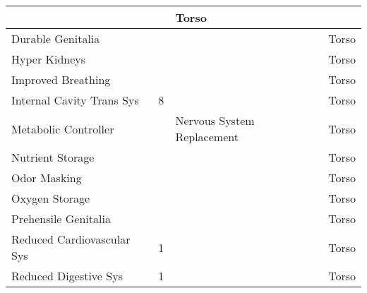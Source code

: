\documentclass[twoside]{book}
\begin{document}
\begin{longtable}{p{1.25in}p{2em}ll}
  &
  
  &
   Torso 
  \tabularnewline
  \hline
      
  \raggedright
           Durable Genitalia 
  &
  
  &
  
  &
   Torso 
  \tabularnewline
  \hline
      
  \raggedright
           Hyper Kidneys 
  &
  
  &
  
  &
   Torso 
  \tabularnewline
  \hline
      
  \raggedright
           Improved Breathing 
  &
  
  &
  
  &
   Torso 
  \tabularnewline
  \hline
      
  \raggedright
           Internal Cavity Trans Sys
           
  &
   8 
  &
  
  &
   Torso 
  \tabularnewline
  \hline
      
  \raggedright
           Metabolic Controller 
  &
  
  &
   Nervous System
           Replacement 
  &
   Torso 
  \tabularnewline
  \hline
      
  \raggedright
           Nutrient Storage 
  &
  
  &
  
  &
   Torso 
  \tabularnewline
  \hline
      
  \raggedright
           Odor Masking 
  &
  
  &
  
  &
   Torso 
  \tabularnewline
  \hline
      
  \raggedright
           Oxygen Storage 
  &
  
  &
  
  &
   Torso 
  \tabularnewline
  \hline
      
  \raggedright
           Prehensile Genitalia 
  &
  
  &
  
  &
   Torso 
  \tabularnewline
  \hline
      
  \raggedright
           Reduced Cardiovascular Sys
           
  &
   1 
  &
  
  &
   Torso 
  \tabularnewline
  \hline
      
  \raggedright
           Reduced Digestive Sys 
  &
   1 
  &
  
  &
   Torso 
  \tabularnewline
  \hline
      

\end{longtable}
\end{document}
